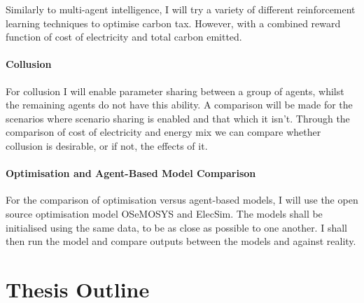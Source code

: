 \documentclass[12pt]{article}
\begin{document}
Similarly to multi-agent intelligence, I will try a variety of different reinforcement learning techniques to optimise carbon tax. However, with a combined reward function of cost of electricity and total carbon emitted.

\paragraph{Collusion}

For collusion I will enable parameter sharing between a group of agents, whilst the remaining agents do not have this ability. A comparison will be made for the scenarios where scenario sharing is enabled and that which it isn't. Through the comparison of cost of electricity and energy mix we can compare whether collusion is desirable, or if not, the effects of it.

\paragraph{Optimisation and Agent-Based Model Comparison}

For the comparison of optimisation versus agent-based models, I will use the open source optimisation model OSeMOSYS and ElecSim. The models shall be initialised using the same data, to be as close as possible to one another. I shall then run the model and compare outputs between the models and against reality.














\clearpage

\section{Thesis Outline}
\end{document}
